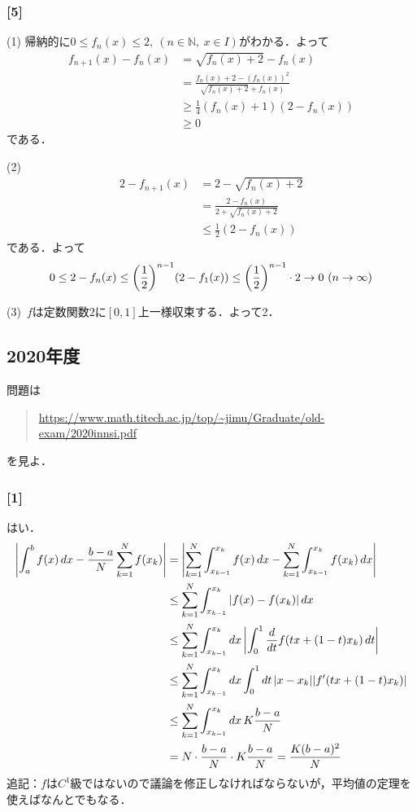 \documentclass[a4j]{ltjsarticle}
\newcommand{\Nset}{\mathbb{N}}
\newcommand{\1}{\mathbbm{1}}
\numberwithin{equation}{section}
\theoremstyle{definition}
\begin{document}
\subsubsection*{[5]}
(1) 帰納的に$0\leq f_n(x)\leq 2,\ (n\in\Nset,\ x\in I)$がわかる．よって
\begin{align}
    f_{n+1}(x)-f_n(x)&=\sqrt{f_n(x)+2}-f_n(x)\\
    &=\frac{f_n(x)+2-(f_n(x))^2}{\sqrt{f_n(x)+2}+f_n(x)}\\
    &\geq \frac{1}{4}(f_n(x)+1)(2-f_n(x))\\
    &\geq0 
\end{align}
である．

(2) 
\begin{align}
    2-f_{n+1}(x)&=2-\sqrt{f_n(x)+2}\\
    &=\frac{2-f_n(x)}{2+\sqrt{f_n(x)+2}}\\
    &\leq \frac{1}{2}(2-f_n(x)) 
\end{align}
である．よって
\begin{equation}
    0\leq 2-f_n(x)\leq \qty(\frac{1}{2})^{n-1}(2-f_1(x))\leq \qty(\frac{1}{2})^{n-1}\cdot 2\to0 \ (n\to\infty)
\end{equation}

(3)\ $f$は定数関数$2$に$[0,1]$上一様収束する．よって2．
\subsection{2020年度}
問題は
\begin{quote}
    \url{https://www.math.titech.ac.jp/top/~jimu/Graduate/old-exam/2020innsi.pdf}
\end{quote}
を見よ．
\subsubsection*{[1]}
はい．
\begin{align}
    \abs{\int_{a}^{b}f(x)\,dx-\frac{b-a}{N}\sum_{k=1}^N f(x_k)}
    &=\abs{\sum_{k=1}^N \int_{x_{k-1}}^{x_k}f(x)\,dx-\sum_{k=1}^N \int_{x_{k-1}}^{x_k} f(x_k)\,dx}\\
    &\leq \sum_{k=1}^N \int_{x_{k-1}}^{x_k}\abs{f(x)-f(x_k)}\,dx\\
    &\leq \sum_{k=1}^N \int_{x_{k-1}}^{x_k}dx\,\abs{\int_{0}^{1}\frac{d}{dt}f(tx+(1-t)x_k)\,dt}\\
    &\leq \sum_{k=1}^N \int_{x_{k-1}}^{x_k}dx\int_{0}^{1}dt\,\abs{x-x_k}\abs{f'(tx+(1-t)x_k)}\\
    &\leq \sum_{k=1}^N \int_{x_{k-1}}^{x_k}dx\,K\frac{b-a}{N}\\
    &=N\cdot\frac{b-a}{N}\cdot K\frac{b-a}{N}=\frac{K(b-a)^2}{N}
\end{align}
追記：$f$は$C^1$級ではないので議論を修正しなければならないが，平均値の定理を使えばなんとでもなる．
\end{document}

